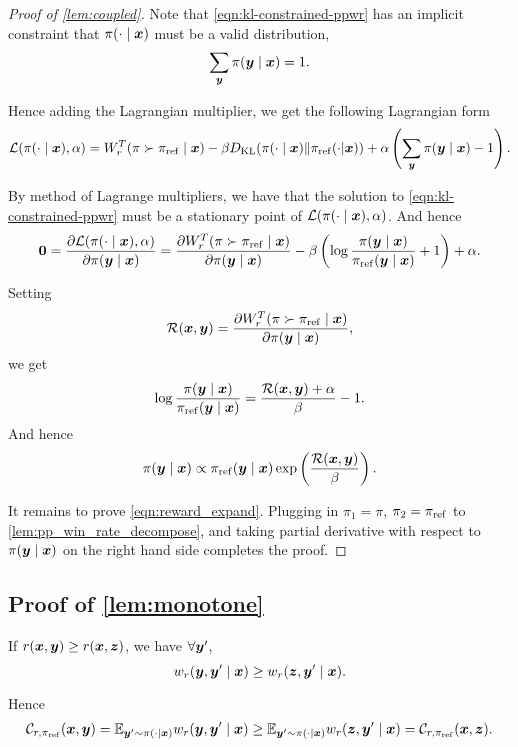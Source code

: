 \begin{proof}[Proof of \cref{lem:coupled}]
Note that \cref{eqn:kl-constrained-ppwr} has an implicit constraint that $\pi(\cdot \mid {\bm{x}})$ must be a valid distribution, \ie
\[
\sum_{{\bm{y}}} \pi({\bm{y}} \mid {\bm{x}}) = 1.
\]

Hence adding the Lagrangian multiplier, we get the following Lagrangian form
\[
    \mathcal{L}(\pi(\cdot \mid {\bm{x}}), \alpha) = W^T_r(\pi \succ {\pi_{\rm ref}} \mid {\bm{x}}) -\beta D_{\text{KL}}(\pi(\cdot \mid {\bm{x}}) \| {\pi_{\rm ref}}(\cdot | {\bm{x}})) + \alpha \left(\sum_{{\bm{y}}} \pi({\bm{y}} \mid {\bm{x}}) - 1\right).
\]

By method of Lagrange multipliers, we have that the solution to \cref{eqn:kl-constrained-ppwr} must be a stationary point of $\mathcal{L}(\pi(\cdot \mid {\bm{x}}), \alpha)$. And hence
\[
\mathbf{0} = \frac{\partial \mathcal{L}(\pi(\cdot \mid {\bm{x}}), \alpha)}{\partial   \pi({\bm{y}}\mid{\bm{x}})} = \frac{\partial W^T_r(\pi \succ {\pi_{\rm ref}} \mid {\bm{x}})}{\partial   \pi({\bm{y}}\mid{\bm{x}})} - \beta\left(\log\frac{\pi({\bm{y}} \mid {\bm{x}})}{{\pi_{\rm ref}}({\bm{y}} \mid {\bm{x}})} + 1\right) + \alpha.
\]

Setting 
\[
    \mathcal{R}({\bm{x}}, {\bm{y}}) = \frac{\partial W^T_r(\pi \succ {\pi_{\rm ref}} \mid {\bm{x}})}{\partial   \pi({\bm{y}}\mid{\bm{x}})},
\]
we get 
\[
\log\frac{\pi({\bm{y}} \mid {\bm{x}})}{{\pi_{\rm ref}}({\bm{y}} \mid {\bm{x}})}  = \frac{ \mathcal{R}({\bm{x}}, {\bm{y}}) + \alpha }{\beta} - 1.
\]
And hence
\[
    \pi({\bm{y}} \mid {\bm{x}}) \propto {\pi_{\rm ref}}({\bm{y}} \mid {\bm{x}}) \exp\left(\frac{\mathcal{R}({\bm{x}}, {\bm{y}})}{\beta}\right).
\]

It remains to prove \cref{eqn:reward_expand}. 
Plugging in $\pi_1 = \pi$, $\pi_2 = {\pi_{\rm ref}}$ to \cref{lem:pp_win_rate_decompose}, and taking partial derivative with respect to $\pi({\bm{y}} \mid {\bm{x}})$ on the right hand side completes the proof.
\end{proof}

\subsection{Proof of \cref{lem:monotone}}
If $r({\bm{x}}, {\bm{y}}) \ge r({\bm{x}}, {\bm{z}})$, we have $\forall {\bm{y}}'$,
\[
w_r({\bm{y}}, {\bm{y}}' \mid {\bm{x}}) \ge w_r({\bm{z}}, {\bm{y}}' \mid {\bm{x}}).
\]

Hence 
\begin{align*}
    \mathcal{C}_{r, {\pi_{\rm ref}}}({\bm{x}}, {\bm{y}}) =  \mathbb{E}_{{\bm{y}}' \sim \pi(\cdot \mid {\bm{x}})} w_r({\bm{y}}, {\bm{y}}' \mid {\bm{x}}) \ge  \mathbb{E}_{{\bm{y}}' \sim \pi(\cdot \mid {\bm{x}})} w_r({\bm{z}}, {\bm{y}}' \mid {\bm{x}}) = \mathcal{C}_{r, {\pi_{\rm ref}}}({\bm{x}}, {\bm{z}}). 
\end{align*}


